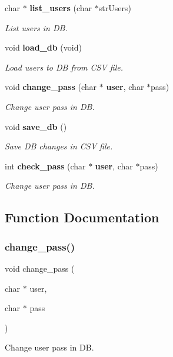 \begin{DoxyCompactItemize}
char $\ast$ \textbf{ list\+\_\+users} (char $\ast$str\+Users)
\begin{DoxyCompactList}\small\item\em List users in DB. \end{DoxyCompactList}\item 
void \textbf{ load\+\_\+db} (void)
\begin{DoxyCompactList}\small\item\em Load users to DB from C\+SV file. \end{DoxyCompactList}\item 
void \textbf{ change\+\_\+pass} (char $\ast$\textbf{ user}, char $\ast$pass)
\begin{DoxyCompactList}\small\item\em Change user pass in DB. \end{DoxyCompactList}\item 
void \textbf{ save\+\_\+db} ()
\begin{DoxyCompactList}\small\item\em Save DB changes in C\+SV file. \end{DoxyCompactList}\item 
int \textbf{ check\+\_\+pass} (char $\ast$\textbf{ user}, char $\ast$pass)
\begin{DoxyCompactList}\small\item\em Change user pass in DB. \end{DoxyCompactList}\end{DoxyCompactItemize}


\subsection{Function Documentation}
\mbox{\label{auth_8c_a94e83fe1538f3e714f97775e42b00843}} 
\subsubsection{change\+\_\+pass()}
{\footnotesize\ttfamily void change\+\_\+pass (\begin{DoxyParamCaption}\item[{char $\ast$}]{user,  }\item[{char $\ast$}]{pass }\end{DoxyParamCaption})}



Change user pass in DB. 


